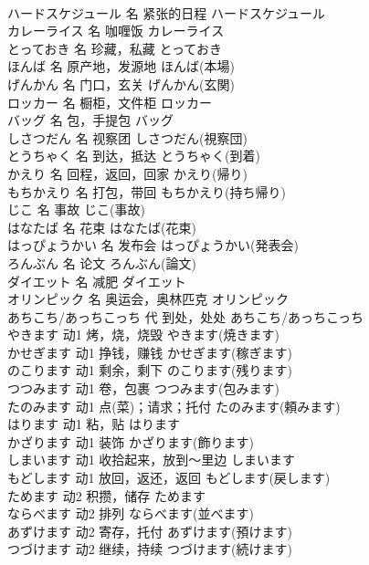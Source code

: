 \documentclass[8pt]{extreport}
\begin{document}
\begin{CJK}{UTF8}{min}
\\	ハードスケジュール	名	紧张的日程	ハードスケジュール	
\\	カレーライス	名	咖喱饭	カレーライス	
\\	とっておき	名	珍藏，私藏	とっておき	
\\	ほんば	名	原产地，发源地	ほんば(本場)	
\\	げんかん	名	门口，玄关	げんかん(玄関)	
\\	ロッカー	名	橱柜，文件柜	ロッカー	
\\	バッグ	名	包，手提包	バッグ	
\\	しさつだん	名	视察团	しさつだん(視察団)	
\\	とうちゃく	名	到达，抵达	とうちゃく(到着)	
\\	かえり	名	回程，返回，回家	かえり(帰り)	
\\	もちかえり	名	打包，带回	もちかえり(持ち帰り)	
\\	じこ	名	事故	じこ(事故)	
\\	はなたば	名	花束	はなたば(花束)	
\\	はっぴょうかい	名	发布会	はっぴょうかい(発表会)	
\\	ろんぶん	名	论文	ろんぶん(論文)	
\\	ダイエット	名	减肥	ダイエット	
\\	オリンピック	名	奥运会，奥林匹克	オリンピック	
\\	あちこち/あっちこっち	代	到处，处处	あちこち/あっちこっち	
\\	やきます	动1	烤，烧，烧毁	やきます(焼きます)	
\\	かせぎます	动1	挣钱，赚钱	かせぎます(稼ぎます)	
\\	のこります	动1	剩余，剩下	のこります(残ります)	
\\	つつみます	动1	卷，包裹	つつみます(包みます)	
\\	たのみます	动1	点(菜)；请求；托付	たのみます(頼みます)	
\\	はります	动1	粘，贴	はります	
\\	かざります	动1	装饰	かざります(飾ります)	
\\	しまいます	动1	收拾起来，放到～里边	しまいます	
\\	もどします	动1	放回，返还，返回	もどします(戻します)	
\\	ためます	动2	积攒，储存	ためます	
\\	ならべます	动2	排列	ならべます(並べます)	
\\	あずけます	动2	寄存，托付	あずけます(預けます)	
\\	つづけます	动2	继续，持续	つづけます(続けます)	

\end{CJK}
\end{document}
